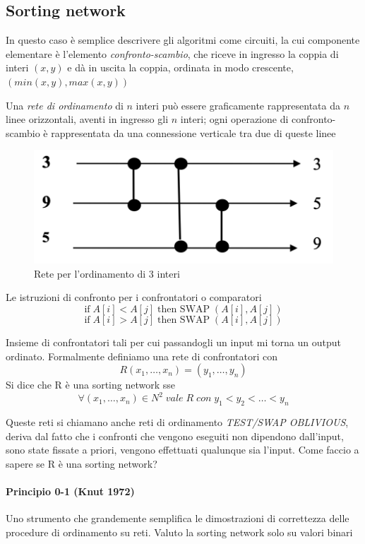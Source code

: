 \subsection{Sorting network}
In questo caso è semplice descrivere gli algoritmi come circuiti, la cui componente elementare è l’elemento \textit{confronto-scambio}, che riceve in ingresso la coppia di interi $(x,y)$ e dà in uscita la coppia, ordinata in modo crescente, $(min(x,y), max(x,y))$

Una \textit{rete di ordinamento} di $n$ interi può essere graficamente rappresentata da $n$ linee orizzontali, aventi in ingresso gli $n$ interi; ogni operazione di confronto-scambio è rappresentata da una connessione verticale tra due di queste linee

\begin{figure}[h]
    \centering
    \includegraphics[scale=0.4]{images/sorting_network.png}
    \caption{Rete per l’ordinamento di $3$ interi}
\end{figure}

\begin{definizione}
    Le istruzioni di confronto per i confrontatori o comparatori
    $$\text{if}\;A[i]<A[j]\;\text{then SWAP}\;(A[i], A[j])$$
    $$\text{if}\;A[i]>A[j]\;\text{then SWAP}\;(A[i], A[j])$$
\end{definizione}

Insieme di confrontatori tali per cui passandogli un input mi torna un output ordinato. Formalmente definiamo una rete di confrontatori con
$$R(x_1, \dots , x_n) = (y_1, \dots , y_n)$$
Si dice che R è una sorting network sse 
$$\forall (x_1, \dots , x_n) \in N^2 \; vale\; R \; con\; y_1 < y_2 < \dots < y_n$$

Queste reti si chiamano anche reti di ordinamento \textit{TEST/SWAP OBLIVIOUS}, deriva dal fatto che i confronti che vengono eseguiti non dipendono dall'input, sono state fissate a priori, vengono effettuati qualunque sia l'input. Come faccio a sapere se R è una sorting network?

\paragraph{Principio 0-1 (Knut 1972)}
Uno strumento che grandemente semplifica le dimostrazioni di correttezza delle procedure di ordinamento su reti. Valuto la sorting network solo su valori binari

